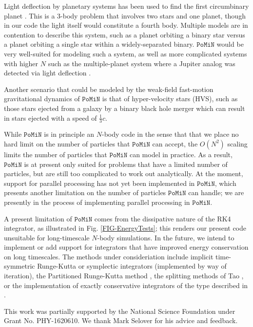 \documentclass[aps,onecolumn,notitlepage,eqsecnum,nofootinbib,floatfix,superscriptaddress]{revtex4-1}
\newcommand{\codename}{\mathtt{PoMiN}}
\begin{document}
Light deflection by planetary systems has been used to find the first circumbinary planet \cite{circumbinary_planet}.  This is a 3-body problem that involves two stars and one planet, though in our code the light itself would constitute a fourth body.  Multiple models are in contention to describe this system, such as a planet orbiting a binary star versus a planet orbiting a single star within a widely-separated binary.  $\codename$ would be very well-suited for modeling such a system, as well as more complicated systems with higher $N$ such as the multiple-planet system where a Jupiter analog was detected via light deflection \cite{Jupiter_microlensing}.

Another scenario that could be modeled by the weak-field fast-motion gravitational dynamics of $\codename$ is that of hyper-velocity stars (HVS), such as those stars ejected from a galaxy by a binary black hole merger which can result in stars ejected with a speed of $\frac{1}{3} c$.  \cite{Loeb1} \cite{Loeb2} 

While $\codename$ is in principle an $N$-body code in the sense that that we place no hard limit on the number of particles that $\codename$ can accept, the $O(N^2)$ scaling limits the number of particles that $\codename$ can model in practice. As a result, $\codename$ is at present only suited for problems that have a limited number of particles, but are still too complicated to work out analytically. At the moment, support for parallel processing has not yet been implemented in $\codename$, which presents another limitation on the number of particles $\codename$ can handle; we are presently in the process of implementing parallel processing in $\codename$. 

A present limitation of $\codename$ comes from the dissipative nature of the RK4 integrator, as illustrated in Fig. \ref{FIG-EnergyTests}; this renders our present code unsuitable for long-timescale $N$-body simulations. In the future, we intend to implement or add support for integrators that have improved energy conservation on long timescales. The methods under consideriation include implicit time-symmetric Runge-Kutta or symplectic integrators \cite{Hutetal1997,Hutetal1995} (implemented by way of iteration), the Partitioned Runge-Kutta method \cite{SanzSernaCalvo1994}, the splitting methods of Tao \cite{Tao2016}, or the implementation of exactly conservative integrators of the type described in \cite{Shadwicketal1995}. 

\begin{acknowledgments}
This work was partially supported by the National Science Foundation under Grant No. PHY-1620610. We thank Mark Selover for his advice and feedback.
\end{acknowledgments}


\end{document}
